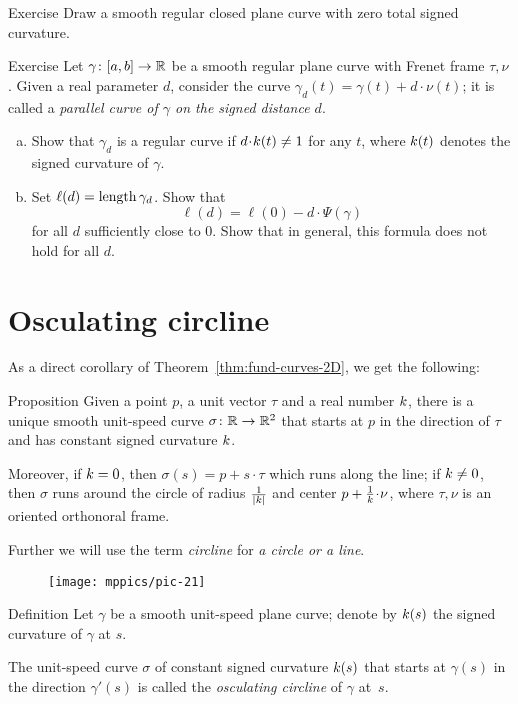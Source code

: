 \begin{thm}{Exercise}\label{ex:zero-tsc}
Draw a smooth regular closed plane curve with zero total signed curvature.
\end{thm}

\begin{thm}{Exercise}\label{ex:length'}
Let $\gamma\colon[a,b]\to\mathbb{R}$ be a smooth regular plane curve with Frenet frame $\tau,\nu$.
Given a real parameter $d$, consider
the curve $\gamma_d(t)=\gamma(t)+d\cdot\nu(t)$; it is called a \emph{parallel curve of $\gamma$ on the signed distance $d$}.

\begin{enumerate}[(a)]
\item Show that $\gamma_d$ is a regular curve if $d\cdot \skur(t)\ne 1$ for any $t$, where $k(t)$ denotes the signed curvature of $\gamma$. 
\item Set $\ell(d)=\mathop{\rm length}\nolimits\gamma_d$.
Show that 
\[\ell(d)=\ell(0)-d\cdot\Psi(\gamma)\]
for all $d$ sufficiently close to $0$. Show that in general, this formula does not hold for all $d$. 
\end{enumerate}


 

\end{thm}


\section*{Osculating circline}

As a direct corollary of Theorem~\ref{thm:fund-curves-2D}, we get the following:

\begin{thm}{Proposition}\label{prop:circline}
Given a point $p$,
a unit vector $\tau$ 
and a real number $k$, there is a unique smooth unit-speed curve $\sigma\colon\mathbb{R}\to\mathbb{R}^2$ 
that starts at $p$ in the direction of $\tau$ and has constant signed curvature $k$.

Moreover, if $k=0$, then $\sigma(s)=p+s\cdot \tau$ which runs along the line;
if $k\ne 0$, then $\sigma$ runs around the circle of radius $\tfrac1{|k|}$ and center $p+\tfrac1\skur\cdot \nu$, where $\tau,\nu$ is an oriented orthonoral frame.
\end{thm}

Further we will use the term \emph{circline} for \emph{a circle or a line}.

{

\begin{wrapfigure}{r}{31 mm}
\vskip-0mm
\centering
\texttt{[image: mppics/pic-21]}
\vskip0mm
\end{wrapfigure}

\begin{thm}{Definition}
Let $\gamma$ be a smooth unit-speed plane curve;
denote by $k(s)$ the signed curvature of $\gamma$ at $s$.

The unit-speed curve $\sigma$ of constant signed curvature $k(s)$ that starts at $\gamma(s)$ in the direction $\gamma'(s)$ is called the \emph{osculating circline} of $\gamma$ at~$s$.
\end{thm}

}

